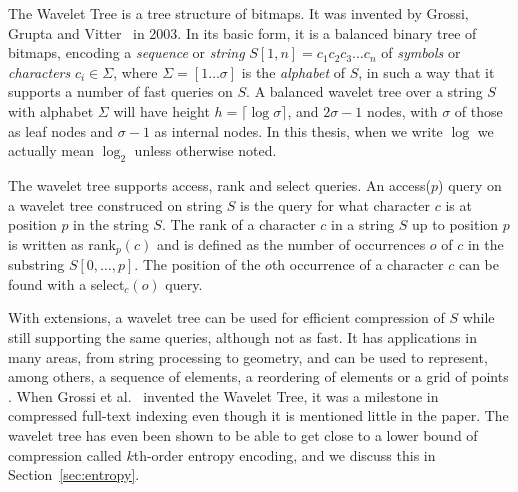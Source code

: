 The Wavelet Tree is a tree structure of bitmaps.
It was invented by Grossi, Grupta and Vitter~ in 2003.
In its basic form, it is a balanced binary tree of bitmaps, encoding a \textit{sequence} or \textit{string} $S[1,n] = c_1c_2c_3 \ldots c_n$ of \textit{symbols} or \textit{characters} $c_i \in \Sigma$, where $\Sigma = [1 \ldots \sigma]$ is the \textit{alphabet} of $S$, in such a way that it supports a number of fast queries on $S$.
A balanced wavelet tree over a string $S$ with alphabet $\Sigma$ will have height $h = \lceil \log \sigma \rceil$, and $2 \sigma - 1$ nodes, with $\sigma$ of those as leaf nodes and $\sigma - 1$ as internal nodes.
In this thesis, when we write $\log$ we actually mean $\log_2$ unless otherwise noted.

The wavelet tree supports access, rank and select queries.
An access($p$) query on a wavelet tree construced on string $S$ is the query for what character $c$ is at position $p$ in the string $S$.
The rank of a character $c$ in a string $S$ up to position $p$ is written as rank$_{p}(c)$ and is defined as the number of occurrences $o$ of $c$ in the substring $S[0, \ldots, p]$.
The position of the $o$th occurrence of a character $c$ can be found with a select$_c(o)$ query.

With extensions, a wavelet tree can be used for efficient compression of $S$ while still supporting the same queries, although not as fast.
It has applications in many areas, from string processing to geometry, and can be used to represent, among others, a sequence of elements, a reordering of elements or a grid of points . 
When Grossi et al.~ invented the Wavelet Tree, it was a milestone in compressed full-text indexing even though it is mentioned little in the paper.
The wavelet tree has even been shown to be able to get close to a lower bound of compression called $k$th-order entropy encoding, and we discuss this in Section~\ref{sec:entropy}.